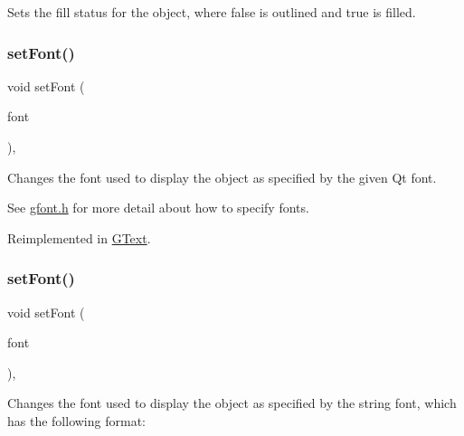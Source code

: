 Sets the fill status for the object, where {\ttfamily false} is outlined and {\ttfamily true} is filled. 

\mbox{\label{classsgl_1_1GObject_a2592348886ffea646c6534bf88f7c49d}} 
\subsubsection{\texorpdfstring{set\+Font()}{setFont()}\hspace{0.1cm}{\footnotesize\ttfamily [1/2]}}
{\footnotesize\ttfamily void set\+Font (\begin{DoxyParamCaption}\item[{const Q\+Font \&}]{font }\end{DoxyParamCaption})\hspace{0.3cm}{\ttfamily [virtual]}, {\ttfamily [inherited]}}



Changes the font used to display the object as specified by the given Qt font. 

See \mbox{\hyperlink{gfont_8h_source}{gfont.\+h}} for more detail about how to specify fonts. 

Reimplemented in \mbox{\hyperlink{classsgl_1_1GText_ad1d75b3840a41ba7d1e8a921696dc684}{G\+Text}}.

\mbox{\label{classsgl_1_1GObject_a8e096e8818d838aceae1d46d58fb3a7b}} 
\subsubsection{\texorpdfstring{set\+Font()}{setFont()}\hspace{0.1cm}{\footnotesize\ttfamily [2/2]}}
{\footnotesize\ttfamily void set\+Font (\begin{DoxyParamCaption}\item[{const std\+::string \&}]{font }\end{DoxyParamCaption})\hspace{0.3cm}{\ttfamily [virtual]}, {\ttfamily [inherited]}}



Changes the font used to display the object as specified by the string {\ttfamily font}, which has the following format\+: 


